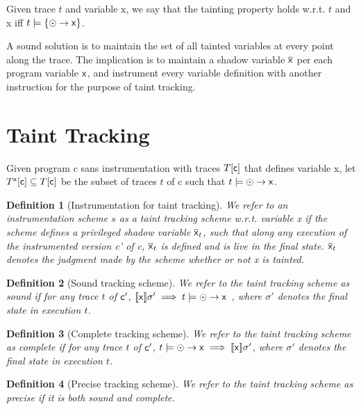\documentclass[]{article}
\newcommand{\lsyn}{[\![}
\newcommand{\rsyn}{]\!]}
\newtheorem{defn}{Definition}
\begin{document}
Given trace $t$ and variable {\sf x}, we say that the tainting property holds w.r.t. $t$ and {\sf x} iff $t \models \{ \odot \rightarrow {\sf x} \}$.

A sound solution is to maintain the set of all tainted variables at every point along the trace. The implication is to maintain a shadow variable $\overline{{\sf x}}$ per each program variable ${\sf x}$, and instrument every variable definition with another instruction for the purpose of taint tracking. 

\section{Taint Tracking}

Given program {\sf c} sans instrumentation with traces $T[{\sf c}]$ that defines variable {\sf x}, let $T^{\sf x}[{\sf c}] \subseteq T[{\sf c}]$ be the subset of traces $t$ of {\sf c} such that $t \models \odot \rightarrow {\sf x}$.

\begin{defn}[Instrumentation for taint tracking] We refer to an instrumentation scheme $s$ as a \emph{taint tracking scheme} w.r.t. variable {\sf x} if 
the scheme defines a privileged shadow variable $\overline{\sf x}_t$, such that 
along any execution of the instrumented version {\sf c'} of {\sf c}, $\overline{\sf x}_t$ is defined and is live in the final state. $\overline{\sf x}_t$ denotes the judgment made by the scheme whether or not {\sf x} is tainted.
\end{defn}

\begin{defn}[Sound tracking scheme] We refer to the taint tracking scheme as \emph{sound} if for any trace $t$ of ${\sf c'}$, 
	$\lsyn {\sf x} \rsyn \sigma' \implies t \models \odot \rightarrow {\sf x}$ , where $\sigma'$ denotes the final state in execution $t$.
\end{defn}

\begin{defn}[Complete tracking scheme] We refer to the taint tracking scheme as \emph{complete} if for any trace $t$ of ${\sf c'}$, 
	$t \models \odot \rightarrow {\sf x} \implies \lsyn {\sf x} \rsyn \sigma'$, where $\sigma'$ denotes the final state in execution $t$.
\end{defn}

\begin{defn}[Precise tracking scheme] We refer to the taint tracking scheme as \emph{precise} if it is both sound and complete.
\end{defn}
\end{document}
